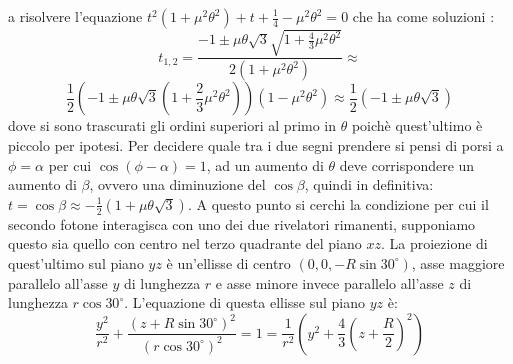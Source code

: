   a risolvere l'equazione \(t^2 \left( 1 + \mu^2 \theta^2 \right) + t + \frac{1}{4} - \mu^2 \theta^2=0\) che ha come soluzioni :
  $$ t_{1,2} = \frac{-1 \pm \mu \theta \sqrt{3} \sqrt{1 + \frac{4}{3} \mu^2 \theta^2 }}{2\left( 1 + \mu^2 \theta^2 \right)} \approx$$
  $$ \frac{1}{2}\left(-1 \pm \mu \theta \sqrt{3} \left(1 + \frac{2}{3} \mu^2 \theta^2 \right)\right)\left( 1 - \mu^2 \theta^2 \right) \approx \frac{1}{2} \left( -1 \pm \mu \theta \sqrt{3} \right)$$
  dove si sono trascurati gli ordini superiori al primo in \(\theta\) poichè quest'ultimo è piccolo per ipotesi. Per decidere quale tra i due segni prendere si pensi di porsi a
  \( \phi = \alpha \) per cui \(\cos \left( \phi - \alpha \right) = 1\), ad un aumento di \(\theta\) deve corrispondere un aumento di \(\beta\), ovvero una diminuzione del \(\cos \beta\),
  quindi in definitiva: \(t= \cos \beta \approx -\frac{1}{2} \left( 1 + \mu \theta \sqrt{3} \right) \).
  A questo punto si cerchi la condizione per cui il secondo fotone interagisca con uno dei due rivelatori rimanenti, supponiamo questo sia quello con centro nel terzo quadrante
  del piano \(xz\). La proiezione di quest'ultimo sul piano \(yz\) è un'ellisse di centro \(\left(0,0,-R \sin 30^\circ \right)\), asse maggiore parallelo all'asse \(y\) di lunghezza \(r\) e asse minore invece parallelo
  all'asse \(z\) di lunghezza \(r \cos 30^\circ\). L'equazione di questa ellisse sul piano \(yz\) è:
  $$ \frac{y^2}{r^2} + \frac{\left( z + R \sin 30^\circ \right)^2}{\left(r \cos 30^\circ\right)^2} = 1 = \frac{1}{r^2}\left(y^2 + \frac{4}{3} \left( z + \frac{R}{2} \right)^2 \right) $$
  
  
  
